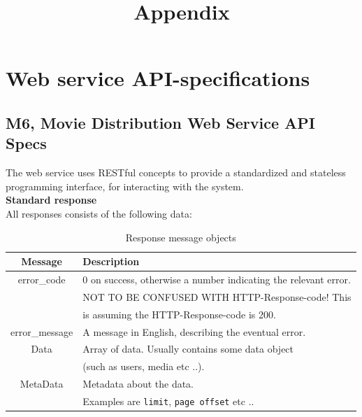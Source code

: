 \documentclass[11pt]{article}
\title{Appendix}
\begin{document}
\maketitle

\setcounter{tocdepth}{3}
\tableofcontents
\vspace*{1cm}

\newpage

\section{Web service API-specifications}
\subsection{M6, Movie Distribution Web Service API Specs}

The web service uses RESTful concepts to provide a standardized and stateless programming interface, for interacting with the system. \\

\textbf{Standard response} \\
All responses consists of the following data:

\begin{table}[H]
\caption{Response message objects}
\begin{center}
\begin{tabular}{|c|l|}
\hline
 Message                     &  Description                                               \\
\hline
 error\_code   &  0 on success, otherwise a number indicating the relevant error.  \\
                             &  NOT TO BE CONFUSED WITH HTTP-Response-code! This   \\
                             &  is assuming the HTTP-Response-code is 200.                \\
\hline
 error\_message  &  A message in English, describing the eventual error.      \\
\hline
Data & Array of data. Usually contains some data object \\
	& (such as users, media etc ..).
\\
\hline
MetaData & Metadata about the data. \\
	& Examples are \texttt{limit}, \texttt{page offset} etc .. \\
\hline
\end{tabular}
\end{center}
\end{table}
\end{document}
